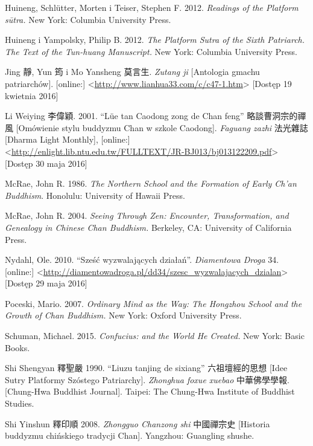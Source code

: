 Huineng, Schlütter, Morten i Teiser, Stephen F. 2012. \textit{Readings of the Platform sūtra.} New York: Columbia University Press.

Huineng i Yampolsky, Philip B. 2012. \textit{The Platform Sutra of the Sixth Patriarch. The Text of the Tun-huang Manuscript.} New York: Columbia University Press.

Jing 靜, Yun 筠 i Mo Yansheng 莫言生. \textit{Zutang ji} [Antologia gmachu patriarchów]. [online:] <\url{http://www.lianhua33.com/c/c47-1.htm}> [Dostęp 19 kwietnia 2016]

Li Weiying 李偉穎. 2001. ``Lüe tan Caodong zong de Chan feng'' 略談曹洞宗的禪風 [Omówienie stylu buddyzmu Chan w szkole Caodong]. \textit{Faguang zazhi} 法光雜誌 [Dharma Light Monthly], [online:] <\url{http://enlight.lib.ntu.edu.tw/FULLTEXT/JR-BJ013/bj013122209.pdf}> [Dostęp 30 maja 2016]

McRae, John R. 1986. \textit{The Northern School and the Formation of Early Ch'an Buddhism}. Honolulu: University of Hawaii Press.

McRae, John R. 2004. \textit{Seeing Through Zen: Encounter, Transformation, and Genealogy in Chinese Chan Buddhism.} Berkeley, CA: University of California Press.

Nydahl, Ole. 2010. ``Sześć wyzwalających działań''. \textit{Diamentowa Droga} 34. [online:] <\url{http://diamentowadroga.pl/dd34/szesc_wyzwalajacych_dzialan}> [Dostęp 29 maja 2016]

Poceski, Mario. 2007. \textit{Ordinary Mind as the Way: The Hongzhou School and the Growth of Chan Buddhism.} New York: Oxford University Press.

Schuman, Michael. 2015. \textit{Confucius: and the World He Created.} New York: Basic Books.

Shi Shengyan 釋聖嚴 1990. ``Liuzu tanjing de sixiang'' 六祖壇經的思想 [Idee Sutry Platformy Szóstego Patriarchy]. \textit{Zhonghua foxue xuebao} 中華佛學學報. [Chung-Hwa Buddhist Journal]. Taipei: The Chung-Hwa Institute of Buddhist Studies.

Shi Yinshun 釋印順 2008. \textit{Zhongguo Chanzong shi} 中國禪宗史 [Historia buddyzmu chińskiego tradycji Chan]. Yangzhou: Guangling shushe.
